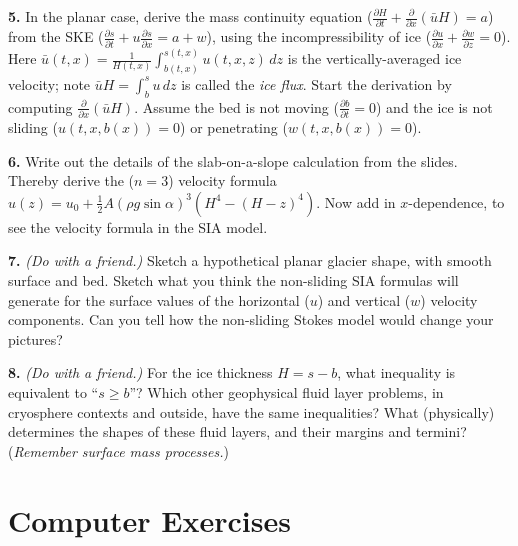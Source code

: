 \documentclass[12pt]{amsart}
\newcommand{\prob}[1]{\medskip\noindent\textbf{#1.}\quad }
\begin{document}
\prob{5}  In the planar case, derive the mass continuity equation ($\frac{\partial H}{\partial t} + \frac{\partial}{\partial x}(\bar u H) = a$) from the SKE ($\frac{\partial s}{\partial t} + u \frac{\partial s}{\partial x} = a + w$), using the incompressibility of ice ($\frac{\partial u}{\partial x} + \frac{\partial w}{\partial z} = 0$).  Here $\bar u(t,x) = \frac{1}{H(t,x)} \int_{b(t,x)}^{s(t,x)} u(t,x,z)\,dz$ is the vertically-averaged ice velocity; note $\bar u H = \int_b^s u\,dz$ is called the \emph{ice flux}.  Start the derivation by computing $\frac{\partial}{\partial x}(\bar u H)$.  Assume the bed is not moving ($\frac{\partial b}{\partial t} = 0$) and the ice is not sliding ($u(t,x,b(x))=0$) or penetrating ($w(t,x,b(x))=0$).

\prob{6}  Write out the details of the slab-on-a-slope calculation from the slides.  Thereby derive the ($n=3$) velocity formula $u(z) = u_0 + \frac{1}{2} A (\rho g \sin\alpha)^3  \left(H^4 - (H-z)^4\right)$.  Now add in $x$-dependence, to see the velocity formula in the SIA model.

\prob{7}  \emph{(Do with a friend.)}  Sketch a hypothetical planar glacier shape, with smooth surface and bed.  Sketch what you think the non-sliding SIA formulas will generate for the surface values of the horizontal ($u$) and vertical ($w$) velocity components.  Can you tell how the non-sliding Stokes model would change your pictures?

\prob{8}  \emph{(Do with a friend.)}  For the ice thickness $H=s-b$, what inequality is equivalent to ``$s\ge b$''?   Which other geophysical fluid layer problems, in cryosphere contexts and outside, have the same inequalities?  What (physically) determines the shapes of these fluid layers, and their margins and termini?  (\emph{Remember surface mass processes.})


\section*{Computer Exercises}
\end{document}
